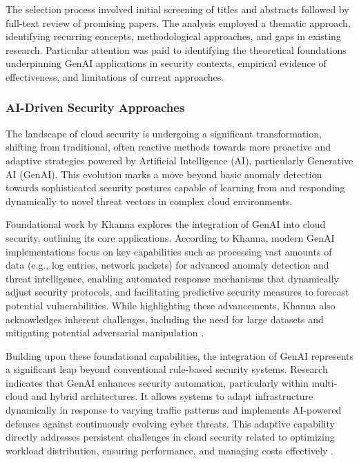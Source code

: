 The selection process involved initial screening of titles and abstracts followed by full-text review of promising papers. The analysis employed a thematic approach, identifying recurring concepts, methodological approaches, and gaps in existing research. Particular attention was paid to identifying the theoretical foundations underpinning GenAI applications in security contexts, empirical evidence of effectiveness, and limitations of current approaches.


\subsubsection{AI-Driven Security Approaches} %
\label{sec:AI-Driven Security Approaches}

The landscape of cloud security is undergoing a significant transformation, shifting from traditional, often reactive methods towards more proactive and adaptive strategies powered by Artificial Intelligence (AI), particularly Generative AI (GenAI). This evolution marks a move beyond basic anomaly detection towards sophisticated security postures capable of learning from and responding dynamically to novel threat vectors in complex cloud environments.

Foundational work by Khanna \cite{khanna_enhancing_2024} explores the integration of GenAI into cloud security, outlining its core applications. According to Khanna, modern GenAI implementations focus on key capabilities such as processing vast amounts of data (e.g., log entries, network packets) for advanced anomaly detection and threat intelligence, enabling automated response mechanisms that dynamically adjust security protocols, and facilitating predictive security measures to forecast potential vulnerabilities. While highlighting these advancements, Khanna also acknowledges inherent challenges, including the need for large datasets and mitigating potential adversarial manipulation \cite{khanna_enhancing_2024}.

Building upon these foundational capabilities, the integration of GenAI represents a significant leap beyond conventional rule-based security systems. Research indicates that GenAI enhances security automation, particularly within multi-cloud and hybrid architectures. It allows systems to adapt infrastructure dynamically in response to varying traffic patterns and implements AI-powered defenses against continuously evolving cyber threats. This adaptive capability directly addresses persistent challenges in cloud security related to optimizing workload distribution, ensuring performance, and managing costs effectively \cite{seth_ai_2025}.

